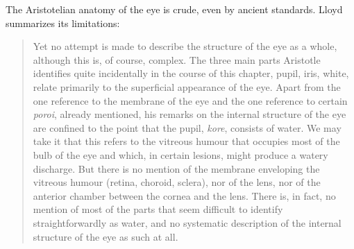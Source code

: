 
The Aristotelian anatomy of the eye is crude, even by ancient standards. Lloyd summarizes its limitations:
\begin{quote}
	Yet no attempt is made to describe the structure of the eye as a whole, although this is, of course, complex. The three main parts Aristotle identifies quite incidentally in the course of this chapter, pupil, iris, white, relate primarily to the superficial appearance of the eye. Apart from the one reference to the membrane of the eye and the one reference to certain \emph{poroi}, already mentioned, his remarks on the internal structure of the eye are confined to the point that the pupil, \emph{kore}, consists of water. We may take it that this refers to the vitreous humour that occupies most of the bulb of the eye and which, in certain lesions, might produce a watery discharge. But there is no mention of the membrane enveloping the vitreous humour (retina, choroid, sclera), nor of the lens, nor of the anterior chamber between the cornea and the lens. There is, in fact, no mention of most of the parts that seem difficult to identify straightforwardly as water, and no systematic description of the internal structure of the eye as such at all. \citep[220--221]{Lloyd:1978fk}
\end{quote}
